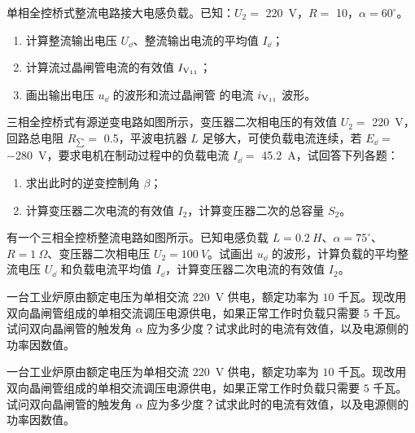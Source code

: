 \documentclass[电力电子]{subfiles}
\begin{document}
\begin{ti}[18 分]
	单相全控桥式整流电路接大电感负载。已知：$U_{2} = $ \SI{220}{V}，$R = $ \SI{10}{\Omega}，$\alpha = 60^\circ$。
	\begin{enumerate}
		\item 计算整流输出电压 $U_{\dd}$、整流输出电流的平均值 $I_{\dd}$；
		\item 计算流过晶闸管电流的有效值 $I_{\text{V\textsubscript{11}}}$；
		\item 画出输出电压 $u_{\dd}$ 的波形和流过晶闸管 \V 的电流 $i_{\text{V\textsubscript{11}}}$ 波形。
	\end{enumerate}
\end{ti}

\begin{ti}[10 分]
	三相全控桥式有源逆变电路如图所示，变压器二次相电压的有效值 $U_{2} = $ \SI{220}{V}，回路总电阻 $R_{\sum} = $ \SI{0.5}{\Omega}，平波电抗器 $L$ 足够大，可使负载电流连续，若 $E_{\dd} = $ \SI{-280}{V}，要求电机在制动过程中的负载电流 $I_{\dd} = $ \SI{45.2}{A}，试回答下列各题：
	\begin{enumerate}
		\item 求出此时的逆变控制角 $\beta$；
		\item 计算变压器二次电流的有效值 $I_{2}$，计算变压器二次的总容量 $S_{2}$。
	\end{enumerate}
\end{ti}

\begin{ti}[10 分]
	有一个三相全控桥整流电路如图所示。已知电感负载 $L = \SI{0.2}{H}$、$\alpha = 75^\circ$、$R = \SI{1}{\Omega}$、变压器二次相电压 $U_{2} = \SI{100}{V}$。试画出 $u_{\dd}$ 的波形，计算负载的平均整流电压 $U_{\dd}$ 和负载电流平均值 $I_{\dd}$，计算变压器二次电流的有效值 $I_{2}$。
\end{ti}

\begin{ti}[10 分]
	一台工业炉原由额定电压为单相交流 \SI{220}{V} 供电，额定功率为 $10$ 千瓦。现改用双向晶闸管组成的单相交流调压电源供电，如果正常工作时负载只需要 $5$ 千瓦。试问双向晶闸管的触发角 $\alpha$ 应为多少度？试求此时的电流有效值，以及电源侧的功率因数值。
\end{ti}

\begin{ti}[10 分]
	一台工业炉原由额定电压为单相交流 \SI{220}{V} 供电，额定功率为 $10$ 千瓦。现改用双向晶闸管组成的单相交流调压电源供电，如果正常工作时负载只需要 $5$ 千瓦。试问双向晶闸管的触发角 $\alpha$ 应为多少度？试求此时的电流有效值，以及电源侧的功率因数值。
\end{ti}
\end{document}
